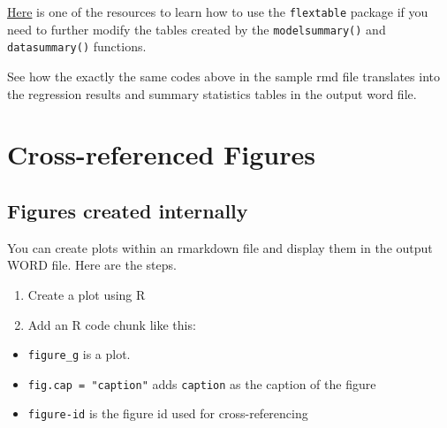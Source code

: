 \documentclass[
  letterpaper,
  DIV=11,
  numbers=noendperiod]{scrreprt}
\providecommand{\tightlist}{%
  \setlength{\itemsep}{0pt}\setlength{\parskip}{0pt}}\usepackage{longtable,booktabs,array}
\begin{document}
\href{https://tmieno2.github.io/AECN-Data-Science-R/Chapter-7-MakeTable_flextable/make_table_flextable_x.html?panelset6=instruction5\&panelset7=instruction6\&panelset8=introduction2\&panelset9=instruction7\&panelset10=add_*_row\%28\%292\&panelset11=instruction8\#1}{Here}
is one of the resources to learn how to use the \texttt{flextable}
package if you need to further modify the tables created by the
\texttt{modelsummary()} and \texttt{datasummary()} functions.

\begin{tcolorbox}[enhanced jigsaw, colframe=quarto-callout-note-color-frame, toptitle=1mm, colbacktitle=quarto-callout-note-color!10!white, toprule=.15mm, colback=white, arc=.35mm, bottomtitle=1mm, opacitybacktitle=0.6, breakable, left=2mm, coltitle=black, leftrule=.75mm, title=\textcolor{quarto-callout-note-color}{\faInfo}\hspace{0.5em}{Note}, rightrule=.15mm, titlerule=0mm, opacityback=0, bottomrule=.15mm]

See how the exactly the same codes above in the sample rmd file
translates into the regression results and summary statistics tables in
the output word file.

\end{tcolorbox}

\hypertarget{cross-referenced-figures}{%
\section{Cross-referenced Figures}\label{cross-referenced-figures}}

\hypertarget{figures-created-internally}{%
\subsection{Figures created
internally}\label{figures-created-internally}}

You can create plots within an rmarkdown file and display them in the
output WORD file. Here are the steps.

\begin{enumerate}
\def\labelenumi{\arabic{enumi}.}
\item
  Create a plot using R
\item
  Add an R code chunk like this:
\end{enumerate}

\begin{itemize}
\tightlist
\item
  \texttt{figure\_g} is a plot.
\item
  \texttt{fig.cap\ =\ "caption"} adds \texttt{caption} as the caption of
  the figure
\item
  \texttt{figure-id} is the figure id used for cross-referencing
\end{itemize}
\end{document}
